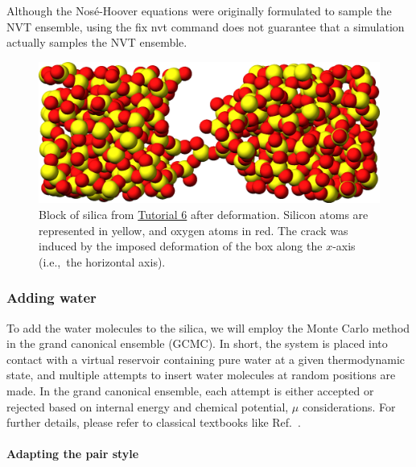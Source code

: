 \documentclass[9pt,tutorial]{livecoms}
\newcommand{\lmpcmd}[1]{\colorbox{listing}{\textcolor{command}{\small{#1}}}} %
\begin{document}
\begin{note}
  Although the Nosé-Hoover equations were originally formulated to sample the
  NVT ensemble, using the \lmpcmd{fix nvt} command does not guarantee that
  a simulation actually samples the NVT ensemble.
\end{note}
\begin{figure}
\centering
\includegraphics[width=\linewidth]{GCMC-cracked}
\caption{Block of silica from \hyperref[gcmc-silica-label]{Tutorial 6}
after deformation.  Silicon atoms are represented in yellow,
and oxygen atoms in red.  The crack was induced by the
imposed deformation of the box along the $x$-axis (i.e.,~the horizontal axis).}
\label{fig:GCMC-cracked}
\end{figure}

\subsubsection{Adding water}

To add the water molecules to the silica, we will employ the Monte Carlo
method in the grand canonical ensemble (GCMC).  In short, the system is
placed into contact with a virtual reservoir containing pure
water at a given thermodynamic state, and multiple attempts to insert
water molecules at random positions are made.  In the grand
canonical ensemble, each attempt is either accepted or rejected based on
internal energy and chemical potential, $\mu$
considerations.  For further details, please refer to
classical textbooks like Ref.~.

\paragraph{Adapting the pair style}
\end{document}
